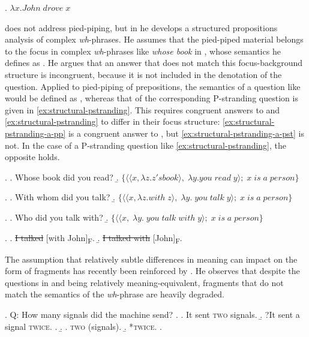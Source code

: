\ex. $\lambda x. John\;drove\;x$

\citet{reich2002a} does not address pied-piping, but in \citet{reich2002} he develops a structured propositions analysis of complex \textit{wh}-phrases. He assumes that the pied-piped material belongs to the focus in complex \textit{wh}-phrases like \textit{whose book} in \Next[a], whose semantics he defines as \Next[b]. He argues that an answer that does not match this focus-background structure is incongruent, because it is not included in the denotation of the question. Applied to pied-piping of prepositions, the semantics of a question like \NNext[a] would be defined as \NNext[b], whereas that of the corresponding P-stranding question is given in \ref{ex:structural-pstranding}. This requires congruent answers to \NNext and \ref{ex:structural-pstranding} to differ in their focus structure: \ref{ex:structural-pstranding-a-pp} is a congruent answer to \NNext, but \ref{ex:structural-pstranding-a-pst} is not. In the case of a P-stranding question like \ref{ex:structural-pstranding}, the opposite holds.

\ex. \a. Whose book did you read?\hfill\citep{reich2002}
    \b. $\{\langle\langle x, \lambda z . z's book \rangle ,\;\lambda y . you\;read\;y \rangle;\; x \; is \; a \; person\}$
    
\ex. \a. With whom did you talk?
    \b. $\{\langle\langle x, \lambda z . with\; z \rangle ,\;\lambda y.\; you\;talk\;y \rangle;\; x \; is \; a \; person\}$

\ex. \label{ex:structural-pstranding}
\a. Who did you talk with?
    \b. $\{\langle\langle x,\;\lambda y.\; you\;talk\;with\;y \rangle;\; x \; is \; a \; person\}$

\ex. \a. \sout{I talked} [with John]\textsubscript{\textsc{F}}.\label{ex:structural-pstranding-a-pp}
     \b.  \sout{I talked with} [John]\textsubscript{\textsc{F}}.\label{ex:structural-pstranding-a-pst}

The assumption that relatively subtle differences in meaning can impact on the form of fragments has recently been reinforced by \citet{weir2018}. He observes that despite the questions in \Next and \NNext being relatively meaning-equivalent, fragments that do not match the semantics of the \textit{wh}-phrase are heavily degraded.

\ex. \label{ex:weir-qa-ex1}
 Q: How many signals did the machine send? \hfill \citep[1289]{weir2018}
\a.  \a. It sent \textsc{two} signals.
\b. ?It sent a signal \textsc{twice}.
\z.
\b. \a. \textsc{two} (signals).
\b. *\textsc{twice}.
\z.

